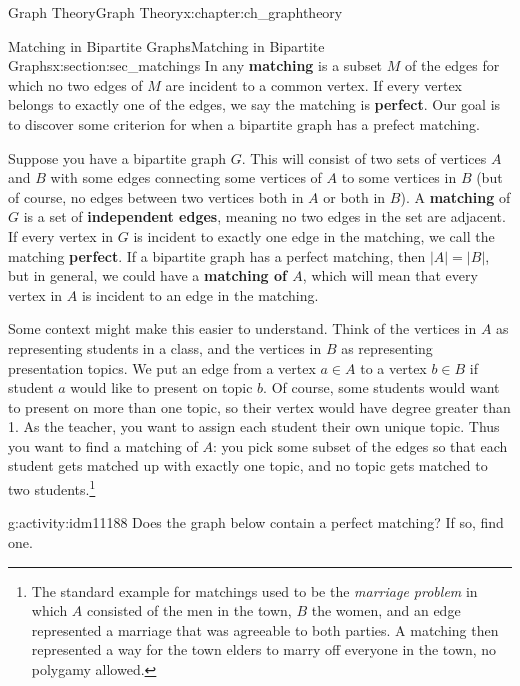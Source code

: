\documentclass[oneside,10pt,]{book}
\newcommand{\terminology}[1]{\textbf{#1}}
\numberwithin{equation}{chapter}
\newcommand{\card}[1]{\left| #1 \right|}
\begin{document}
\begin{chapterptx}{Graph Theory}{}{Graph Theory}{}{}{x:chapter:ch_graphtheory}
%
\begin{sectionptx}{Matching in Bipartite Graphs}{}{Matching in Bipartite Graphs}{}{}{x:section:sec_matchings}
In any \terminology{matching} is a subset \(M\) of the edges for which no two edges of \(M\) are incident to a common vertex.  If every vertex belongs to exactly one of the edges, we say the matching is \terminology{perfect}. Our goal is to discover some criterion for when a bipartite graph has a prefect matching.%
\par
{} Suppose you have a bipartite graph \(G\). This will consist of two sets of vertices \(A\) and \(B\) with some edges connecting some vertices of \(A\) to some vertices in \(B\) (but of course, no edges between two vertices both in \(A\) or both in \(B\)). A \terminology{matching} of \(G\) is a set of \terminology{independent edges}, meaning no two edges in the set are adjacent.  If every vertex in \(G\) is incident to exactly one edge in the matching, we call the matching \terminology{perfect}. If a bipartite graph has a perfect matching, then \(\card{A} = \card{B}\), but in general, we could have a \terminology{matching of \(A\)}, which will mean that every vertex in \(A\) is incident to an edge in the matching.%
\par
Some context might make this easier to understand. Think of the vertices in \(A\) as representing students in a class, and the vertices in \(B\) as representing presentation topics. We put an edge from a vertex \(a \in A\) to a vertex \(b \in B\) if student \(a\) would like to present on topic \(b\). Of course, some students would want to present on more than one topic, so their vertex would have degree greater than 1. As the teacher, you want to assign each student their own unique topic. Thus you want to find a matching of \(A\): you pick some subset of the edges so that each student gets matched up with exactly one topic, and no topic gets matched to two students.\footnote{The standard example for matchings used to be the \emph{marriage problem} in which \(A\) consisted of the men in the town, \(B\) the women, and an edge represented a marriage that was agreeable to both parties.  A matching then represented a way for the town elders to marry off everyone in the town, no polygamy allowed.\label{g:fn:idm11184}}%
\begin{activity}{}{g:activity:idm11188}%
Does the graph below contain a perfect matching? If so, find one.%
\begin{sidebyside}{1}{0.25}{0.25}{0}%
\begin{sbspanel}{0.5}%

\end{sbspanel}
\end{sidebyside}
\end{activity}
\end{sectionptx}
\end{chapterptx}
\end{document}
